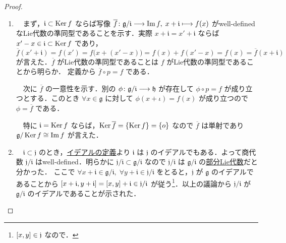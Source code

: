\documentclass[rep_main]{subfiles}
\begin{document}
\begin{proof}
    \begin{enumerate}
        \item 
        　まず，$\mathfrak{i} \subset \operatorname{Ker} f$ ならば写像 $\overline{f} \colon \mathfrak{g} / \mathfrak{i} \longrightarrow \Im f,\; x + \mathfrak{i} \longmapsto f(x)$ がwell-definedなLie代数の準同型であることを示す．実際 $x + \mathfrak{i} = x' + \mathfrak{i}$ ならば $x' - x \in \mathfrak{i} \subset \operatorname{Ker} f$ であり， 
        $\overline{f} (x' + \mathfrak{i}) = f(x') = f\bigl(x + (x' - x)\bigr) = f(x) + f(x'-x) = f(x) = \overline{f} (x + \mathfrak{i})$ が言えた．$\overline{f}$ がLie代数の準同型であることは $f$ がLie代数の準同型であることから明らか．
        定義から $\overline{f} \circ p = f$ である．

        　次に $\overline{f}$ の一意性を示す．別の $\phi \colon \mathfrak{g} / \mathfrak{i} \longrightarrow \mathfrak{h}$ が存在して $\phi \circ p = f$ が成り立つとする．このとき $\forall x \in \mathfrak{g}$ に対して $\phi (x + \iota) = f(x)$ が成り立つので $\phi = \overline{f}$ である．

        　特に $\mathfrak{i} = \operatorname{Ker} f$ ならば，$\operatorname{Ker} \overline{f} = \{\operatorname{Ker} f\} = \{ o \}$ なので $\overline{f}$ は単射であり $\mathfrak{g} / \operatorname{Ker} f \cong \Im f$ が言えた．
        \item 
        　$\mathfrak{i} \subset \mathfrak{j}$ のとき，\hyperref[def:ideal-LieAlg]{イデアルの定義}より $\mathfrak{i}$ は $\mathfrak{j}$ のイデアルでもある．よって商代数 $\mathfrak{j}/\mathfrak{i}$ はwell-defined．明らかに $\mathfrak{j} / \mathfrak{i} \subset \mathfrak{g} / \mathfrak{i}$ なので $\mathfrak{j} / \mathfrak{i}$ は $\mathfrak{g} / \mathfrak{i}$ の\hyperref[def:subLieAlg]{部分Lie代数}だと分かった．
        ここで $\forall x + \mathfrak{i} \in \mathfrak{g}/\mathfrak{i},\; \forall y + \mathfrak{i} \in \mathfrak{j}/ \mathfrak{i}$ をとると，$\mathfrak{j}$ が $\mathfrak{g}$ のイデアルであることから $\comm{x + \mathfrak{i}}{y + \mathfrak{i}} = \comm{x}{y} + \mathfrak{i} \in \mathfrak{j} / \mathfrak{i}$ が従う\footnote{$\comm{x}{y} \in \mathfrak{j}$ なので．}．以上の議論から $\mathfrak{j}/\mathfrak{i}$ が $\mathfrak{g} / \mathfrak{i}$ のイデアルであることが示された．


\end{enumerate}
\end{proof}
\end{document}
